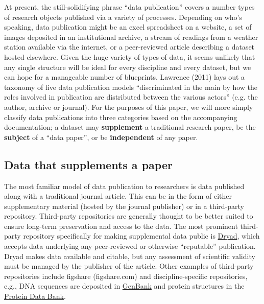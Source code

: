 \documentclass[10pt,a4paper,twocolumn]{article}
\begin{document}
At present, the still-solidifying phrase ``data publication'' covers a number types of research objects published via a variety of processes.
Depending on who's speaking,  data publication might be an excel spreadsheet on a website, a set of images deposited in an institutional archive, a stream of readings from a weather station available via the internet, or a peer-reviewed article describing a dataset hosted elsewhere.
Given the huge variety of types of data, it seems unlikely that any single structure will be ideal for every discipline and every dataset, but we can hope for a manageable number of blueprints. 
Lawrence (2011) lays out a taxonomy of five data publication models ``discriminated in the main by how the roles involved in publication are distributed between the various actors'' (e.g. the author, archive or journal).\cite{lawrence_data_2011} 
For the purposes of this paper, we will more simply classify data publications into three categories based on the accompanying documentation; a dataset may \textbf{supplement} a traditional research paper, be the \textbf{subject} of a ``data paper'', or be \textbf{independent} of any paper.


\subsection*{Data that supplements a paper}\label{paper-supplement-data}

The most familiar model of data publication to researchers is data published along with a traditional journal article. This can be in the form of either supplementary material (hosted by the journal publisher) or in a third-party repository. 
Third-party repositories are generally thought to be better suited to ensure long-term preservation and access to the data.
The most prominent third-party repository specifically for making supplemental data public is \href{http://www.datadryad.org/}{Dryad}, which accepts data underlying any peer-reviewed or otherwise ``reputable'' publication. 
Dryad makes data available and citable, but any assessment of scientific validity must be managed by the publisher of the article. Other examples of third-party repositories include figshare (figshare.com) and discipline-specific repositories, e.g., DNA sequences are deposited in \href{http://www.ncbi.nlm.nih.gov/genbank/}{GenBank}\cite{benson_genbank_2013} and protein structures in the \href{http://www.rcsb.org/}{Protein Data Bank}\cite{berman_the_2000}.
\end{document}
